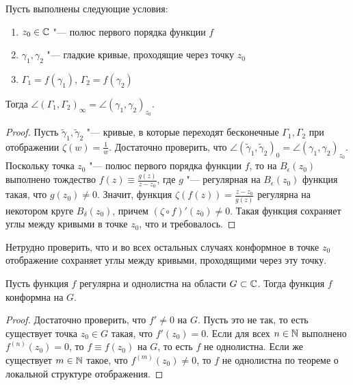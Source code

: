 \begin{proposition}
	Пусть выполнены следующие условия:
	\begin{enumerate}
		\item $z_0 \in \mathbb{C}$ "--- полюс первого порядка функции $f$
		\item $\gamma_1, \gamma_2$ "--- гладкие кривые, проходящие через точку $z_0$
		\item $\Gamma_1 = f(\gamma_1)$, $\Gamma_2 = f(\gamma_2)$
	\end{enumerate}
	
	Тогда $\angle(\Gamma_1, \Gamma_2)_\infty = \angle(\gamma_1, \gamma_2)_{z_0}$.
\end{proposition}

\begin{proof}
	Пусть $\widetilde\gamma_1, \widetilde\gamma_2$ "--- кривые, в которые переходят бесконечные $\Gamma_1, \Gamma_2$ при отображении $\zeta(w) = \frac 1w$. Достаточно проверить, что $\angle(\widetilde\gamma_1, \widetilde\gamma_2)_0 = \angle(\gamma_1, \gamma_2)_{z_0}$. Поскольку точка $z_0$ "--- полюс первого порядка функции $f$, то на $B_\epsilon(z_0)$ выполнено тождество $f(z) \equiv \frac{g(z)}{z - z_0}$, где $g$ "--- регулярная на $B_\epsilon(z_0)$ функция такая, что $g(z_0) \ne 0$. Значит, функция $\zeta(f(z)) = \frac{z - z_0}{g(z)}$ регулярна на некотором круге $B_\delta(z_0)$, причем $(\zeta \circ f)'(z_0) \ne 0$. Такая функция сохраняет углы между кривыми в точке $z_0$, что и требовалось.
\end{proof}

\begin{note}
	Нетрудно проверить, что и во всех остальных случаях конформное в точке $z_0$ отображение сохраняет углы между кривыми, проходящими через эту точку.
\end{note}

\begin{proposition}
	Пусть функция $f$ регулярна и однолистна на области $G \subset \mathbb{C}$. Тогда функция $f$ конформна на $G$.
\end{proposition}

\begin{proof}
	Достаточно проверить, что $f' \ne 0$ на $G$. Пусть это не так, то есть существует точка $z_0 \in G$ такая, что $f'(z_0) = 0$. Если для всех $n \in \mathbb{N}$ выполнено $f^{(n)}(z_0) = 0$, то $f \equiv f(z_0)$ на $G$, то есть $f$ не однолистна. Если же существует $m \in \mathbb{N}$ такое, что $f^{(m)}(z_0) \ne 0$, то $f$ не однолистна по теореме о локальной структуре отображения.
\end{proof}

